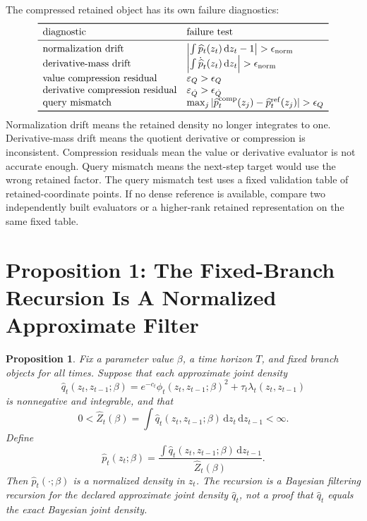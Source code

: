 \documentclass[11pt]{article}
\newtheorem{proposition}{Proposition}
\numberwithin{equation}{section}
\newcommand{\dd}{\,\mathrm d}
\begin{document}
The compressed retained object has its own failure diagnostics:
\begin{equation}
\begin{array}{ll}
\toprule
\text{diagnostic} & \text{failure test}\\
\midrule
\text{normalization drift} &
\left|\int \widehat p_t(z_t)\dd z_t-1\right|>\epsilon_{\rm norm}\\
\text{derivative-mass drift} &
\left|\int \dot{\widehat p}_t(z_t)\dd z_t\right|>\epsilon_{\rm norm}\\
\text{value compression residual} &
\varepsilon_Q>\epsilon_Q\\
\text{derivative compression residual} &
\varepsilon_{\dot Q}>\epsilon_{\dot Q}\\
\text{query mismatch} &
\max_j|\widehat p_t^{\rm comp}(z_j)-\widehat p_t^{\rm ref}(z_j)|>\epsilon_Q\\
\bottomrule
\end{array}
    \label{eq:p26-retained-storage-12}
\end{equation}
Normalization drift means the retained density no longer integrates to one.
Derivative-mass drift means the quotient derivative or compression is
inconsistent.  Compression residuals mean the value or derivative evaluator is
not accurate enough.  Query mismatch means the next-step target would use the
wrong retained factor.  The query mismatch test uses a fixed validation table
of retained-coordinate points.  If no dense reference is available, compare
two independently built evaluators or a higher-rank retained representation on
the same fixed table.

\section{Proposition 1: The Fixed-Branch Recursion Is A Normalized Approximate Filter}

\begin{proposition}
Fix a parameter value \(\beta\), a time horizon \(T\), and fixed branch objects
for all times.  Suppose that each approximate joint density
\begin{equation}
    \widehat q_t(z_t,z_{t-1};\beta)
    =
    e^{-c_t}\phi_t(z_t,z_{t-1};\beta)^2
    +
    \tau_t\lambda_t(z_t,z_{t-1})
    \label{eq:p24-p19-77}
\end{equation}
is nonnegative and integrable, and that
\begin{equation}
    0<\widehat Z_t(\beta)
    =
    \int \widehat q_t(z_t,z_{t-1};\beta)\dd z_t\dd z_{t-1}
    <\infty.
    \label{eq:p24-p19-78}
\end{equation}
Define
\begin{equation}
    \widehat p_t(z_t;\beta)
    =
    \frac{\int \widehat q_t(z_t,z_{t-1};\beta)\dd z_{t-1}}
    {\widehat Z_t(\beta)}.
    \label{eq:p24-p19-79}
\end{equation}
Then \(\widehat p_t(\cdot;\beta)\) is a normalized density in \(z_t\).  The
recursion is a Bayesian filtering recursion for the declared approximate joint
density \(\widehat q_t\), not a proof that \(\widehat q_t\) equals the exact
Bayesian joint density.
\end{proposition}
\end{document}
